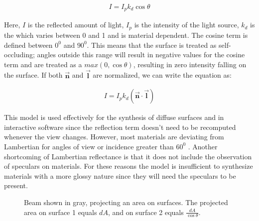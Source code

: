 		\begin{eqnarray*}
			I = I_pk_d\cos\theta
		\end{eqnarray*}

Here, $I$ is the reflected amount of light, $I_p$ is the intensity of the light source, $k_d$ is the  which varies between 0 and 1 and is material dependent. The cosine term is defined between $0^0$ and $90^0$. This means that the surface is treated as self-occluding; angles outside this range will result in negative values for the cosine term and are treated as a $max({0,\cos\theta})$, resulting in zero intensity falling on the surface. If both $\vec{\mathbf{n}}$ and $\vec{\mathbf{l}}$ are normalized, we can write the equation as:

		\begin{eqnarray*}
			I = I_pk_d(\vec{\mathbf{n}} \cdot \vec{\mathbf{l}})
		\end{eqnarray*}

This model is used effectively for the synthesis of diffuse surfaces and in interactive software since the reflection term doesn't need to be recomputed whenever the view changes. However, most materials are deviating from Lambertian for angles of view or incidence greater than $60^0$ \cite{DigitalModeling}. Another shortcoming of Lambertian reflectance is that it does not include the observation of speculars on materials. For these reasons the model is insufficient to synthesize materials with a more glossy nature since they will need the speculars to be present. 


\begin{figure}[H]
	\begin{center}
	\end{center}
	\caption{Beam shown in gray, projecting an area on surfaces. The projected area on surface 1 equals $dA$, and on surface 2 equals $\frac{dA}{\cos\theta}$. }
	\label{fig:BEAM}
\end{figure}





